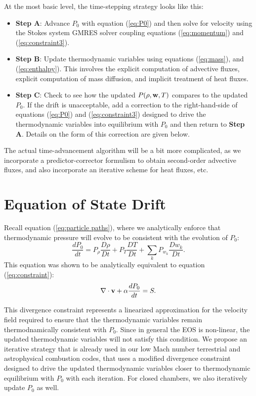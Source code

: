 \documentclass[final]{siamltex}
\def\vb {{\bf v}}
\def\wb {{\bf w}}
\begin{document}
At the most basic level, the time-stepping strategy looks like this:\\
\begin{itemize}
\item {\bf Step A}: Advance $P_0$ with equation (\ref{eq:P0}) and 
then solve for velocity using the Stokes system GMRES solver coupling equations 
(\ref{eq:momentum}) and (\ref{eq:constraint3}).\\
\item {\bf Step B}: Update thermodynamic variables using equations (\ref{eq:mass}), 
and (\ref{eq:enthalpy}).  This involves the explicit computation of advective fluxes,
explicit computation of mass diffusion, and implicit treatment of heat fluxes.\\
\item {\bf Step C}: Check to see how the updated $P(\rho,\wb,T)$ compares to the 
updated $P_0$.  If the drift 
is unacceptable, add a correction to the right-hand-side of equations
(\ref{eq:P0}) and (\ref{eq:constraint3})
designed to drive the thermodynamic variables into equilibrium with 
$P_0$ and then return to {\bf Step A}.  Details on the form of this 
correction are given below.\\
\end{itemize}
The actual time-advancement algorithm will be a bit more complicated, as we 
incorporate a predictor-corrector formulism to obtain second-order advective 
fluxes, and also incorporate an iterative scheme for heat fluxes, etc.

\section{Equation of State Drift}
Recall equation (\ref{eq:particle paths}), where we analytically enforce that
thermodynamic pressure will evolve to be consistent with the evolution of $P_0$:
\begin{equation}
\frac{dP_0}{dt} = P_\rho\frac{D\rho}{Dt} + P_T\frac{DT}{Dt} + \sum_kP_{w_k}\frac{Dw_k}{Dt}.
\end{equation}
This equation was shown to be analytically equivalent to equation (\ref{eq:constraint}):
\begin{equation}
\nabla\cdot\vb + \alpha\frac{dP_0}{dt} = S.
\end{equation}

This divergence constraint represents a linearized approximation for the velocity 
field required to ensure that the thermodynamic variables remain thermodnamically
consistent with $P_0$.  Since in general the EOS is non-linear, the updated 
thermodynamic variables will not
satisfy this condition.  We propose an iterative strategy that is already
used in our low Mach number terrestrial and astrophysical combustion codes, that
uses a modified divergence constraint designed to drive the updated 
thermodynamic variables closer to thermodynamic equilibrium with $P_0$ with each iteration.
For closed chambers, we also iteratively update $P_0$ as well.\\
\end{document}
